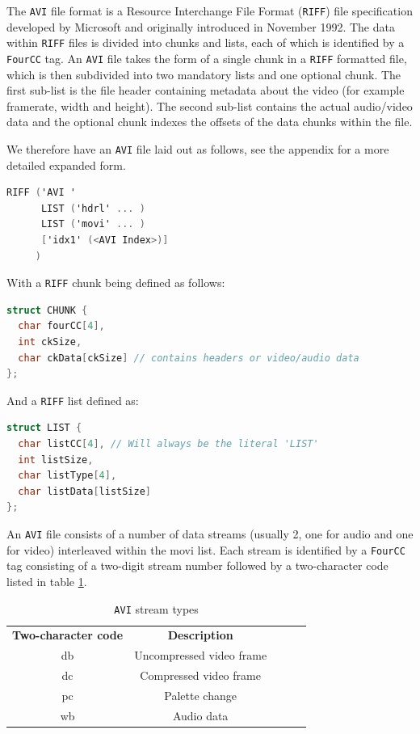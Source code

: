 \documentclass[paper=a4, fontsize=11pt,twoside]{scrartcl}    %
\numberwithin{table}{section}
\numberwithin{figure}{section}
\numberwithin{algorithm}{section}
\begin{document}
The \texttt{AVI} file format is a Resource Interchange File Format (\texttt{RIFF}) file specification developed by Microsoft and originally introduced in November 1992. The data within \texttt{RIFF} files is divided into chunks and lists, each of which is identified by a \texttt{FourCC} tag. An \texttt{AVI} file takes the form of a single chunk in a \texttt{RIFF} formatted file, which is then subdivided into two mandatory lists and one optional chunk. The first sub-list is the file header containing metadata about the video (for example framerate, width and height). The second sub-list contains the actual audio/video data and the optional chunk indexes the offsets of the data chunks within the file.

We therefore have an \texttt{AVI} file laid out as follows, see the appendix for a more detailed expanded form.
\begin{lstlisting}[language=C, caption={\texttt{AVI RIFF} form}, frame=single, upquote=true]
RIFF ('AVI '
      LIST ('hdrl' ... )
      LIST ('movi' ... )
      ['idx1' (<AVI Index>)]
     )
\end{lstlisting}

\noindent
With a \texttt{RIFF} chunk being defined as follows:

\begin{lstlisting}[language=C, caption={\texttt{RIFF} chunk}, frame=single]
struct CHUNK {
  char fourCC[4],
  int ckSize,
  char ckData[ckSize] // contains headers or video/audio data
};
\end{lstlisting}

\noindent
And a \texttt{RIFF} list defined as:

\begin{lstlisting}[language=C, caption={\texttt{RIFF} list}, frame=single]
struct LIST {
  char listCC[4], // Will always be the literal 'LIST'
  int listSize,
  char listType[4],
  char listData[listSize]
};
\end{lstlisting}

\noindent
An \texttt{AVI} file consists of a number of data streams (usually 2, one for audio and one for video) interleaved within the movi list. Each stream is identified by a \texttt{FourCC} tag consisting of a two-digit stream number followed by a two-character code listed in table \ref{table:fourcc}.

\begin{table}[h]
\centering
\begin{tabular}{|c|c|lll}
\cline{1-2}
\textbf{Two-character code} & \textbf{Description}       \\ \cline{1-2}
db                          & Uncompressed video frame   \\ \cline{1-2}
dc                          & Compressed video frame     \\ \cline{1-2}
pc                          & Palette change             \\ \cline{1-2}
wb                          & Audio data                 \\ \cline{1-2}
\end{tabular}
\caption{\texttt{AVI} stream types}
\label{table:fourcc}
\end{table}
\end{document}
